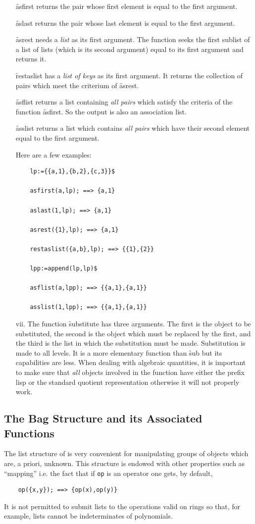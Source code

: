 \begin{itemize}
\f{asfirst} returns the pair whose first element is equal to the
first argument.

\f{aslast} returns the pair whose last element is equal to the first
argument.

\f{asrest} needs a \emph{list} as its first argument. The function
seeks the first sublist of a list of lists (which is its second argument)
equal to its first argument and returns it.

\f{restaslist} has a \emph{list of keys} as its first argument. It
returns the collection of pairs which meet the criterium
of \f{asrest}.

\f{asflist} returns a list containing \emph{all pairs} which
satisfy the criteria of the function \f{asfirst}. So the output
is also an association list.

\f{asslist} returns a list which contains \emph{all pairs} which have
their second element equal to the first argument.

Here are a few examples:
\begin{verbatim}
    lp:={{a,1},{b,2},{c,3}}$

    asfirst(a,lp); ==> {a,1}

    aslast(1,lp); ==> {a,1}

    asrest({1},lp); ==> {a,1}

    restaslist({a,b},lp); ==> {{1},{2}}

    lpp:=append(lp,lp)$

    asflist(a,lpp); ==> {{a,1},{a,1}}

    asslist(1,lpp); ==> {{a,1},{a,1}}
\end{verbatim}
\item[vii.]
\hypertarget{operator:SUBSTITUTE}{}
The function \f{substitute} has three arguments. The first
is the object to be substituted, the second is the object which must be
replaced by the first, and the third is the list in which the substitution
must be made. Substitution is made to
all levels. It is a more elementary function than \f{sub} but its
capabilities are less. When dealing with algebraic quantities, it is
important to make sure that \emph{all} objects involved in the function
have either the prefix lisp or the standard quotient representation
otherwise it will not properly work.
\end{itemize}
\subsection{ The Bag Structure and its Associated Functions}
The list structure of \REDUCE is very convenient for manipulating
groups of objects which are, a priori, unknown. This structure is
endowed with other properties such as ``mapping'' i.e. the fact that
if \texttt{op} is an operator one gets, by default,
\begin{verbatim}
    op({x,y}); ==> {op(x),op(y)}
\end{verbatim}
It is not permitted to submit lists to the operations valid on rings
so that, for example, lists cannot be indeterminates of polynomials.

